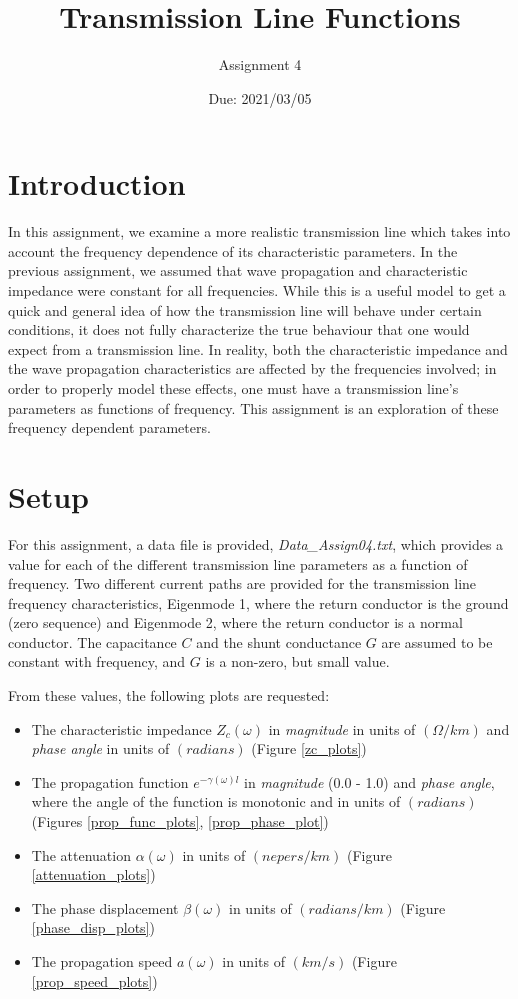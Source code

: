 \documentclass[10pt, oneside, letterpaper]{article}
\title{Transmission Line Functions}
\author{Assignment 4}
\date{Due: 2021/03/05}
\begin{document}
\maketitle
\thispagestyle{fancy}

\section{Introduction}

In this assignment, we examine a more realistic transmission line which takes into account the frequency dependence of its characteristic parameters. In the previous assignment, we assumed that wave propagation and characteristic impedance were constant for all frequencies. While this is a useful model to get a quick and general idea of how the transmission line will behave under certain conditions, it does not fully characterize the true behaviour that one would expect from a transmission line. In reality, both the characteristic impedance and the wave propagation characteristics are affected by the frequencies involved; in order to properly model these effects, one must have a transmission line's parameters as functions of frequency. This assignment is an exploration of these frequency dependent parameters.

\section{Setup}

For this assignment, a data file is provided, \emph{Data\_Assign04.txt}, which provides a value for each of the different transmission line parameters as a function of frequency. Two different current paths are provided for the transmission line frequency characteristics, Eigenmode 1, where the return conductor is the ground (zero sequence) and Eigenmode 2, where the return conductor is a normal conductor. The capacitance $C$ and the shunt conductance $G$ are assumed to be constant with frequency, and $G$ is a non-zero, but small value.

From these values, the following plots are requested:

\begin{itemize}
  \item The characteristic impedance $Z_c(\omega)$ in \emph{magnitude} in units of $(\Omega{}/km)$ and \emph{phase angle} in units of $(radians)$ (Figure \ref{zc_plots})
  \item The propagation function $e^{-\gamma{}(\omega{})l}$ in \emph{magnitude} (0.0 - 1.0) and \emph{phase angle}, where the angle of the function is monotonic and in units of $(radians)$ (Figures \ref{prop_func_plots}, \ref{prop_phase_plot})
  \item The attenuation $\alpha{}(\omega{})$ in units of $(nepers/km)$ (Figure \ref{attenuation_plots})
  \item The phase displacement $\beta{}(\omega{})$ in units of $(radians/km)$ (Figure \ref{phase_disp_plots})
  \item The propagation speed $a(\omega{})$ in units of $(km/s)$ (Figure \ref{prop_speed_plots})
\end{itemize}
\end{document}
